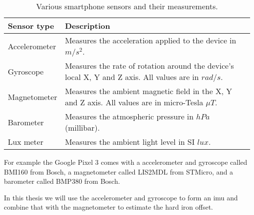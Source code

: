 \begin{table}[h]
    \centering
    \begin{tabular}{ | l | p{10cm} | }
    \hline
    \textbf{Sensor type} & \textbf{Description} \\ \hline
    Accelerometer        & Measures the acceleration applied to the device in $m/s^2$. \\ \hline
    Gyroscope            & Measures the rate of rotation around the device's local X, Y and Z axis. All values are in $rad/s$. \\ \hline
    Magnetometer         & Measures the ambient magnetic field in the X, Y and Z axis. All values are in micro-Tesla $\mu T$. \\ \hline
    Barometer            & Measures the atmospheric pressure in $hPa$ (millibar). \\ \hline
    Lux meter            & Measures the ambient light level in SI $lux$. \\ \hline
    \end{tabular}
    \caption{Various smartphone sensors and their measurements.}
    \label{tbl:particle}
\end{table}

For example the Google Pixel 3 comes with a accelerometer and gyroscope called BMI160 from Bosch, a magnetometer called LIS2MDL from STMicro, and a barometer called BMP380 from Bosch.

In this thesis we will use the accelerometer and gyroscope to form an \gls{imu} and combine that with the magnetometer to estimate the hard iron offset.
